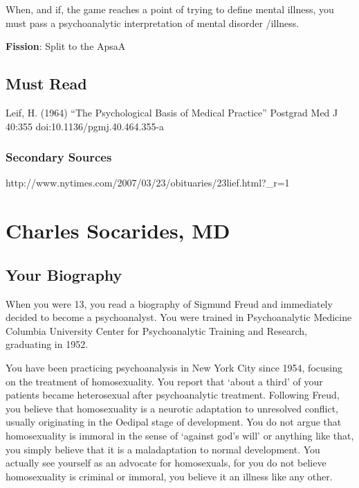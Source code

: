 \begin{refsection}
When, and if, the game reaches a point of trying to define mental illness, you must pass a psychoanalytic interpretation of mental disorder \slash  illness.

\textbf{Fission}: Split to the ApsaA

\section{Must Read}
\label{mustread}

Leif, H. (1964) “The Psychological Basis of Medical Practice” Postgrad Med J 40:355 doi:10.1136\slash pgmj.40.464.355-a

\subsection{Secondary Sources}
\label{secondarysources}

http:\slash \slash www.nytimes.com\slash 2007\slash 03\slash 23\slash obituaries\slash 23lief.html?\_r=1

\chapter{Charles Socarides, MD}
\label{charlessocaridesmd}

\section{Your Biography}
\label{yourbiography}

When you were 13, you read a biography of Sigmund Freud and immediately decided to become a psychoanalyst. You were trained in Psychoanalytic Medicine Columbia University Center for Psychoanalytic Training and Research, graduating in 1952.

You have been practicing psychoanalysis in New York City since 1954, focusing on the treatment of homosexuality. You report that `about a third' of your patients became heterosexual after psychoanalytic treatment. Following Freud, you believe that homosexuality is a neurotic adaptation to unresolved conflict, usually originating in the Oedipal stage of development. You do not argue that homosexuality is immoral in the sense of `against god's will' or anything like that, you simply believe that it is a maladaptation to normal development. You actually see yourself as an advocate for homosexuals, for you do not believe homosexuality is criminal or immoral, you believe it an illness like any other.


\end{refsection}
